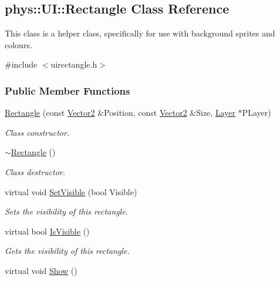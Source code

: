 \hypertarget{classphys_1_1UI_1_1Rectangle}{
\subsection{phys::UI::Rectangle Class Reference}
\label{classphys_1_1UI_1_1Rectangle}
}


This class is a helper class, specifically for use with background sprites and colours.  




{\ttfamily \#include $<$uirectangle.h$>$}

\subsubsection*{Public Member Functions}
\begin{DoxyCompactItemize}
\item 
\hyperlink{classphys_1_1UI_1_1Rectangle_a845e2591ee5bd2d0a7b60debfad1cc57}{Rectangle} (const \hyperlink{classphys_1_1Vector2}{Vector2} \&Position, const \hyperlink{classphys_1_1Vector2}{Vector2} \&Size, \hyperlink{classphys_1_1UI_1_1Layer}{Layer} $\ast$PLayer)
\begin{DoxyCompactList}\small\item\em Class constructor. \item\end{DoxyCompactList}\item 
\hypertarget{classphys_1_1UI_1_1Rectangle_a8862c7e04c2b8911eac4a2d3b6aff165}{
\hyperlink{classphys_1_1UI_1_1Rectangle_a8862c7e04c2b8911eac4a2d3b6aff165}{$\sim$Rectangle} ()}
\label{classphys_1_1UI_1_1Rectangle_a8862c7e04c2b8911eac4a2d3b6aff165}

\begin{DoxyCompactList}\small\item\em Class destructor. \item\end{DoxyCompactList}\item 
virtual void \hyperlink{classphys_1_1UI_1_1Rectangle_a4fa5021010e8cdaf9a9e35b3d4c82461}{SetVisible} (bool Visible)
\begin{DoxyCompactList}\small\item\em Sets the visibility of this rectangle. \item\end{DoxyCompactList}\item 
virtual bool \hyperlink{classphys_1_1UI_1_1Rectangle_aad47a2d9a7c9d8d9111b2edbf44541d5}{IsVisible} ()
\begin{DoxyCompactList}\small\item\em Gets the visibility of this rectangle. \item\end{DoxyCompactList}\item 
\hypertarget{classphys_1_1UI_1_1Rectangle_ab408c7607150b24fbc4f70870705a121}{
virtual void \hyperlink{classphys_1_1UI_1_1Rectangle_ab408c7607150b24fbc4f70870705a121}{Show} ()}
\label{classphys_1_1UI_1_1Rectangle_ab408c7607150b24fbc4f70870705a121}


\end{DoxyCompactItemize}
